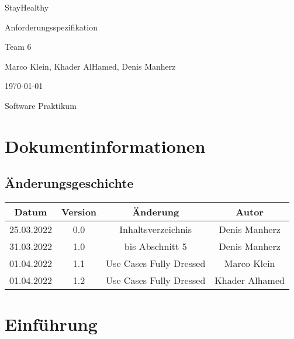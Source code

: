 \documentclass[12pt,a4paper,onecolumn]{article}
\newcommand\titleofdoc{StayHealthy} %
\newcommand\GroupName{Team 6} %
\begin{document}
\begin{titlepage}
   \begin{center}
        \vspace*{4cm} %

        \Huge{\titleofdoc} 

        \vspace{0.5cm}
        \LARGE{Anforderungsspezifikation}
            
        \vspace{3 cm}
        \Large{\GroupName}
       
        \vspace{0.25cm}
        \large{Marco Klein, Khader AlHamed, Denis Manherz}
       
        \vspace{3 cm}
        \Large{\today}%
        
        \vspace{0.25 cm}
        \Large{Software Praktikum}
       

       \vfill
    \end{center}
\end{titlepage}
\setcounter{page}{2}
\tableofcontents
\newpage

\section{Dokumentinformationen} 
\subsection{Änderungsgeschichte}
\begin{center}
\begin{tabular}{ |c|c|c|c| } 
 \hline
 Datum & Version & Änderung & Autor\\ 
 \hline
 25.03.2022 & 0.0 & Inhaltsverzeichnis & Denis Manherz \\ 
 \hline
 31.03.2022 & 1.0 & bis Abschnitt 5 & Denis Manherz \\ 
 \hline
 01.04.2022 & 1.1 & Use Cases Fully Dressed & Marco Klein \\ 
 \hline
 01.04.2022 & 1.2 & Use Cases Fully Dressed & Khader Alhamed \\ 
 \hline
\end{tabular}
\end{center}

\section{Einführung}
\end{document}
